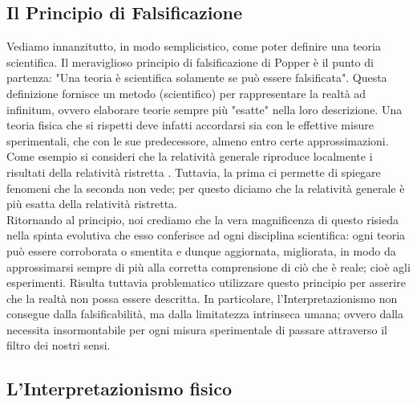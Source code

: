 \documentclass[]{article}
\begin{document}
		\subsection{Il Principio di Falsificazione}
	Vediamo innanzitutto, in modo semplicistico, come poter definire una teoria scientifica.
	Il meraviglioso principio di falsificazione di Popper è il punto di partenza: "Una teoria è scientifica solamente se può essere falsificata". Questa definizione fornisce un metodo (scientifico) per rappresentare la realtà ad infinitum, ovvero elaborare teorie sempre più "esatte" nella loro descrizione. Una teoria fisica che si rispetti deve infatti accordarsi sia con le effettive misure sperimentali, che con le sue predecessore, almeno entro certe approssimazioni. Come esempio si consideri che la relatività generale riproduce localmente i risultati della relatività ristretta%
	. Tuttavia, la prima ci permette di spiegare fenomeni che la seconda non vede; per questo diciamo che la relatività generale è più esatta della relatività ristretta. \\
	Ritornando al principio, noi crediamo che la vera magnificenza di questo risieda nella spinta evolutiva che esso conferisce ad ogni disciplina scientifica: ogni teoria può essere corroborata o smentita e dunque aggiornata, migliorata, in modo da approssimarsi sempre di più alla corretta comprensione di ciò che è reale; cioè agli esperimenti. 
	Risulta tuttavia problematico utilizzare questo principio per asserire che la realtà non possa essere descritta. In particolare, l'Interpretazionismo non consegue dalla falsificabilità, ma dalla limitatezza intrinseca umana; ovvero dalla necessita insormontabile per ogni misura sperimentale di passare attraverso il filtro dei nostri sensi.  
	
	\subsection{L'Interpretazionismo fisico}
\end{document}
